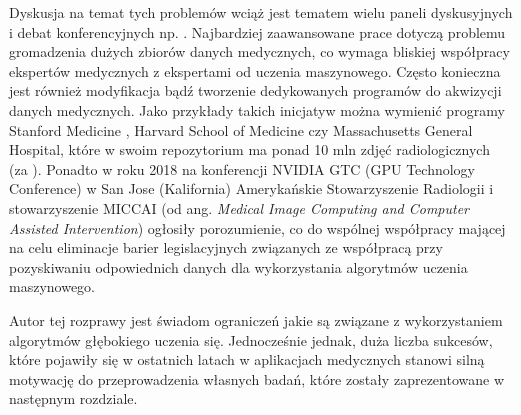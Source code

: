 Dyskusja na temat tych problemów wciąż jest tematem wielu paneli dyskusyjnych i debat konferencyjnych np. \cite{NVIDIApanel}. Najbardziej zaawansowane prace dotyczą problemu gromadzenia dużych zbiorów danych medycznych, co wymaga bliskiej współpracy ekspertów medycznych z ekspertami od uczenia maszynowego. Często konieczna jest również modyfikacja bądź tworzenie dedykowanych programów do akwizycji danych medycznych. Jako przykłady takich inicjatyw można wymienić programy Stanford Medicine \cite{MedicalImageNet}, Harvard School of Medicine \cite{HMS} czy Massachusetts General Hospital, które w swoim repozytorium ma ponad 10 mln zdjęć radiologicznych (za \cite{MGH}). Ponadto w roku 2018 na konferencji NVIDIA GTC (GPU Technology Conference) w San Jose (Kalifornia) Amerykańskie Stowarzyszenie Radiologii i stowarzyszenie MICCAI (od ang. \textit{Medical Image Computing and Computer Assisted Intervention}) ogłosiły porozumienie, co do wspólnej współpracy mającej na celu eliminacje barier legislacyjnych związanych ze współpracą przy pozyskiwaniu odpowiednich danych dla wykorzystania algorytmów uczenia maszynowego.

Autor tej rozprawy jest świadom ograniczeń jakie są związane z wykorzystaniem algorytmów głębokiego uczenia się. Jednocześnie jednak, duża liczba sukcesów, które pojawiły się w ostatnich latach w aplikacjach medycznych stanowi silną motywację do przeprowadzenia własnych badań, które zostały zaprezentowane w następnym rozdziale.


    
